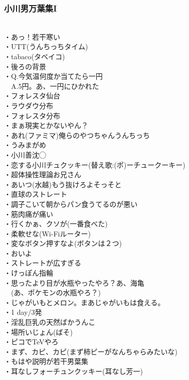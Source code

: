 \documentclass[12pt]{jsarticle}
\begin{document}
\subsubsection{小川男万葉集I} 
　\\
・あっ！若干寒い\\
・UTT(うんちっちタイム)\\
・tabaco(タベイコ)\\
・後ろの背景\\
・Q.今気温何度か当てたら一円\\
　A.5円。あ、一円にひかれた\\
・フォレスタ仙台\\
・ラウダウ分布\\
・フォレスタ分布\\
・まぁ現実とかないやん？\\
・あれ(ファミマ)俺らのやつちゃんうんちっち\\
・うみまがめ\\
・小川善沈◯\\
・恋する小川チュクッキー(替え歌:(ポ)ーチュークーキー)\\
・超体操性理論お兄さん\\
・あいつ(水越)もう抜けろよそっそと\\
・直球のストレート\\
・調子こいて朝からパン食うてるのが悪い\\
・筋肉痛が痛い\\
・行くかぁ、クソが(一番食べた)\\
・柔軟せな(Wi-Fiルーター)\\
・変なボタン押すなよ(ボタンは２つ)\\
・おいよ\\
・ストレートが広すぎる\\
・けっぽん指輪\\
・思ったより目が水瓶やったやろ？あ、海亀\\
　(あ、ポケモンの水瓶やろ？)\\
・じゃがいもとメロン。まあじゃがいもは食える。\\
・1 day/3発\\
・淫乱巨乳の天然ばかうんこ\\
・場所いじょん(ばそ)\\
・ピコでTeVやろ\\
・まず、カピ、カピ(まず柿ピーがなんちゃらみたいな)\\
・もはや説明が若干男葉集\\
・耳なしフォーチュンクッキー(耳なし芳一)\\
\end{document}
